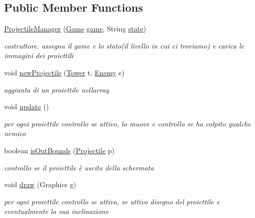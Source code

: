 \subsection*{Public Member Functions}
\begin{DoxyCompactItemize}
\item 
\hyperlink{classmanagers_1_1_projectile_manager_a8959cc2d690b9ea6bf95b0b029352d50}{Projectile\+Manager} (\hyperlink{classprogetto_1_1_game}{Game} \hyperlink{classmanagers_1_1_projectile_manager_ac6a5ed6191fcf3a5bf0445921feb4f48}{game}, String \hyperlink{classmanagers_1_1_projectile_manager_a91ac952876f776b3fbbc8519e093fdbf}{state})
\begin{DoxyCompactList}\small\item\em costruttore. assegna il game e lo stato(il livello in cui ci troviamo) e carica le immagini dei proiettili \end{DoxyCompactList}\item 
void \hyperlink{classmanagers_1_1_projectile_manager_ad4505ed80d64e9561393c0406fe7d904}{new\+Projectile} (\hyperlink{classtowers_1_1_tower}{Tower} t, \hyperlink{classenemies_1_1_enemy}{Enemy} e)
\begin{DoxyCompactList}\small\item\em aggiunta di un proiettile nell\textquotesingle{}array \end{DoxyCompactList}\item 
void \hyperlink{classmanagers_1_1_projectile_manager_ac5c54df7ed3b930268c8d7752c101725}{update} ()
\begin{DoxyCompactList}\small\item\em per ogni proiettile controllo se attivo, lo muove e controllo se ha colpito qualche nemico \end{DoxyCompactList}\item 
boolean \hyperlink{classmanagers_1_1_projectile_manager_a57d53b4aface986fa08a24dab39b621d}{is\+Out\+Bounds} (\hyperlink{classobjects_1_1_projectile}{Projectile} p)
\begin{DoxyCompactList}\small\item\em controllo se il proiettile è uscito della schermata \end{DoxyCompactList}\item 
void \hyperlink{classmanagers_1_1_projectile_manager_a72fe1ffca978e99fd16994a10e7f8051}{draw} (Graphics g)
\begin{DoxyCompactList}\small\item\em per ogni proiettile controllo se attivo, se attivo disegno del proiettile e eventualmente la sua inclinazione \end{DoxyCompactList}\item 

\end{DoxyCompactItemize}

